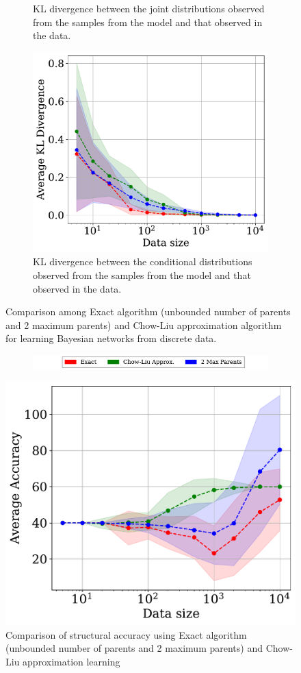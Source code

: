 \begin{figure}[htp!]
\begin{subfigure}{0.32\textwidth}
         \caption{KL divergence between the joint distributions observed from the samples from the model and that observed in the data.}
         \label{fig:kl_div_joint}
     \end{subfigure}
     \hfill
     \begin{subfigure}{0.32\textwidth}
         \centering
         \includegraphics[width=\textwidth]{plots/conditionals_kl_divergence.pdf}
         \caption{KL divergence between the conditional distributions observed from the samples from the model and that observed in the data.}
         \label{fig:kl_div_marginals}
     \end{subfigure}
        \caption{Comparison among Exact algorithm (unbounded number of parents and 2 maximum parents) and Chow-Liu approximation algorithm for learning Bayesian networks from discrete data.}
        \label{fig:str_learning_comp}
\end{figure}

\begin{figure}[htp!]
\begin{subfigure}{0.7\textwidth}
         \centering
    \includegraphics[width=\textwidth]{plots/legends.pdf}
     \end{subfigure}
    \centering
    \includegraphics[width=0.5\linewidth]{plots/accuracy.pdf}
    \caption{Comparison of structural accuracy using Exact algorithm (unbounded number of parents and 2 maximum parents) and Chow-Liu approximation learning}
    \label{fig:str_acc}
\end{figure}